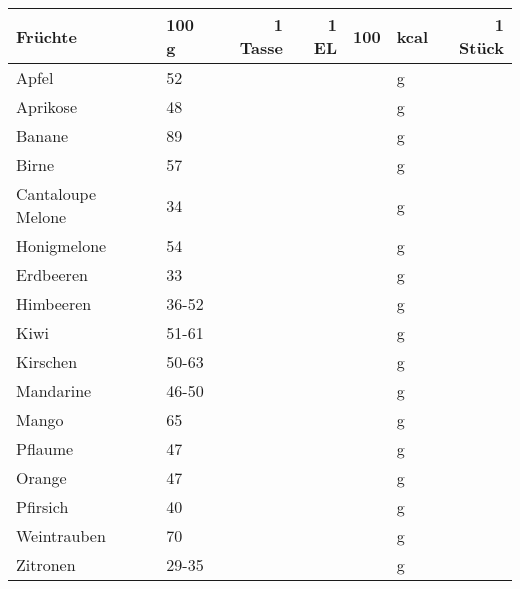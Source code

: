 \begin{tabularx}{\linewidth}{X|l|r|r|rl|r}
Früchte           &   100 g & 1 Tasse & 1 EL &      100 & kcal    & 1 Stück  \\
\hline
Apfel             &      52 &         &      &          & g       &          \\
Aprikose          &      48 &         &      &          & g       &          \\
Banane            &      89 &         &      &          & g       &          \\
Birne             &      57 &         &      &          & g       &          \\
Cantaloupe Melone &      34 &         &      &          & g       &          \\
Honigmelone       &      54 &         &      &          & g       &          \\
Erdbeeren         &      33 &         &      &          & g       &          \\
Himbeeren         &   36-52 &         &      &          & g       &          \\
Kiwi              &   51-61 &         &      &          & g       &          \\
Kirschen          &   50-63 &         &      &          & g       &          \\
Mandarine         &   46-50 &         &      &          & g       &          \\
Mango             &      65 &         &      &          & g       &          \\
Pflaume           &      47 &         &      &          & g       &          \\
Orange            &      47 &         &      &          & g       &          \\
Pfirsich          &      40 &         &      &          & g       &          \\
Weintrauben       &      70 &         &      &          & g       &          \\
Zitronen          &   29-35 &         &      &          & g       &          \\
\end{tabularx}

\newpage


